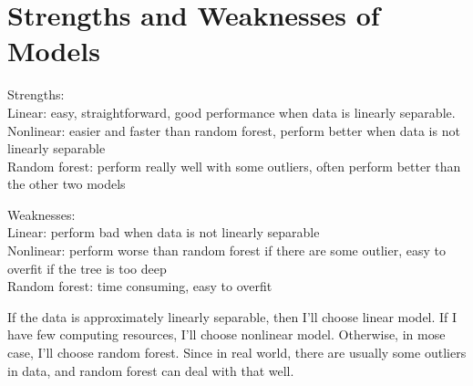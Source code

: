 \section{Strengths and Weaknesses of Models}

Strengths:\\
Linear: easy, straightforward, good performance when data is linearly separable.\\
Nonlinear: easier and faster than random forest, perform better when data is not linearly separable\\
Random forest: perform really well with some outliers, often perform better than the other two models

Weaknesses:\\
Linear: perform bad when data is not linearly separable\\
Nonlinear: perform worse than random forest if there are some outlier, easy to overfit if the tree is too deep\\
Random forest: time consuming, easy to overfit

If the data is approximately linearly separable, then I'll choose linear model. If I have few computing resources, I'll choose nonlinear model. Otherwise, in mose case, I'll choose random forest. Since in real world, there are usually some outliers in data, and random forest can deal with that well.
